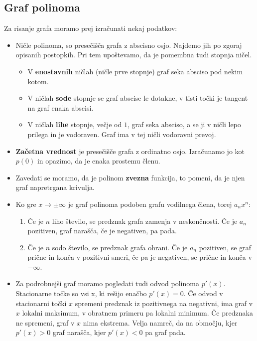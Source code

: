 \subsection{Graf polinoma}
Za risanje grafa moramo prej izračunati nekaj podatkov:
\begin{itemize}
\item Ničle polinoma, so presečišča grafa z abscisno osjo. Najdemo jih po zgoraj opisanih postopkih. Pri tem upoštevamo, da je pomembna tudi stopnja ničel. 
\begin{itemize}
\item V \textbf{enostavnih} ničlah (ničle prve stopnje) graf seka absciso pod nekim kotom.
\item V ničlah \textbf{sode} stopnje se graf abscise le dotakne, v tisti točki je tangent na graf enaka abscisi.
\item V ničlah \textbf{lihe} stopnje, večje od $1$, graf seka absciso, a se ji v ničli lepo prilega in je vodoraven. Graf ima v tej ničli vodoravni prevoj.
\end{itemize}
\item \textbf{Začetna vrednost} je presečišče grafa z ordinatno osjo. Izračunamo jo kot $p(0)$ in opazimo, da je enaka prostemu členu.
\item Zavedati se moramo, da je polinom \textbf{zvezna} funkcija, to pomeni, da je njen graf napretrgana krivulja. 
\item Ko gre $x\to \pm \infty$  je graf polinoma podoben grafu vodilnega člena, torej $a_nx^n$:
\begin{enumerate}
\item Če je $n$ liho število, se predznak grafa zamenja v neskončnosti. Če je $a_ n$ pozitiven, graf narašča, če je negativen, pa pada.
\item Če je $n$ sodo število, se predznak grafa ohrani. Če je $a_ n$ pozitiven, se graf prične in konča v pozitivni smeri, če pa je negativen, se prične in konča v $-\infty$.
\end{enumerate}
\item Za podrobnejši graf moramo pogledati tudi odvod polinoma \textbf{$p'(x)$}. Stacionarne točke so vsi x, ki rešijo enačbo $p'(x)=0$. Če odvod v stacionarni točki $x$ spremeni predznak iz pozitivnega na negativni, ima graf v $x$ lokalni maksimum, v obratnem primeru pa lokalni minimum. Če predznaka ne spremeni, graf v $x$ nima ekstrema. Velja namreč, da na območju, kjer $p'(x) >0$ graf narašča, kjer $p'(x)<0$ pa graf pada.
\end{itemize}





